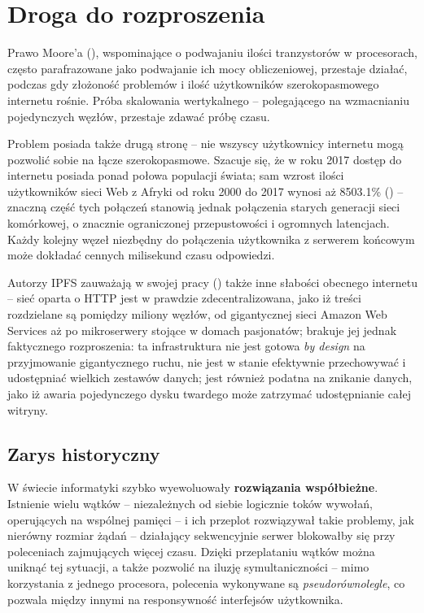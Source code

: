 \chapter{Droga do rozproszenia}
\label{cha:rozproszenie}

Prawo Moore'a (\cite{moore1998cramming}), wspominające o podwajaniu ilości tranzystorów w procesorach, często parafrazowane jako podwajanie ich mocy obliczeniowej, przestaje działać, podczas gdy złożoność problemów i ilość użytkowników szerokopasmowego internetu rośnie. 
Próba skalowania wertykalnego -- polegającego na wzmacnianiu pojedynczych węzłów, przestaje zdawać próbę czasu.

Problem posiada także drugą stronę -- nie wszyscy użytkownicy internetu mogą pozwolić sobie na łącze szerokopasmowe. Szacuje się, że w roku 2017 dostęp do internetu posiada ponad połowa populacji świata; sam wzrost ilości użytkowników sieci Web z Afryki od roku 2000 do 2017 wynosi aż 8503.1\% (\cite{webStats}) – znaczną część tych połączeń stanowią jednak połączenia starych generacji sieci komórkowej, o znacznie ograniczonej przepustowości i ogromnych latencjach. Każdy kolejny węzeł niezbędny do połączenia użytkownika z serwerem końcowym może dokładać cennych milisekund czasu odpowiedzi. 

Autorzy IPFS zauważają w swojej pracy (\cite{ipfsWP}) także inne słabości obecnego internetu – sieć oparta o HTTP jest w prawdzie zdecentralizowana, jako iż treści rozdzielane są pomiędzy miliony węzłów, od gigantycznej sieci Amazon Web Services aż po mikroserwery stojące w domach pasjonatów; brakuje jej jednak faktycznego rozproszenia: ta infrastruktura nie jest gotowa {\em by design} na przyjmowanie gigantycznego ruchu, nie jest w stanie efektywnie przechowywać i udostępniać wielkich zestawów danych; jest również podatna na znikanie danych, jako iż awaria pojedynczego dysku twardego może zatrzymać udostępnianie całej witryny. 


\section{Zarys historyczny}
\label{sec:teoriaRozproszenia}
W świecie informatyki szybko wyewoluowały \textbf{rozwiązania współbieżne}. Istnienie wielu wątków -- niezależnych od siebie logicznie toków wywołań, operujących na wspólnej pamięci -- i ich przeplot rozwiązywał takie problemy, jak nierówny rozmiar żądań -- działający sekwencyjnie serwer blokowałby się przy poleceniach zajmujących więcej czasu. Dzięki przeplataniu wątków można uniknąć tej sytuacji, a także pozwolić na iluzję symultaniczności -- mimo korzystania z jednego procesora, polecenia wykonywane są {\em pseudorównolegle}, co pozwala między innymi na responsywność interfejsów użytkownika.

